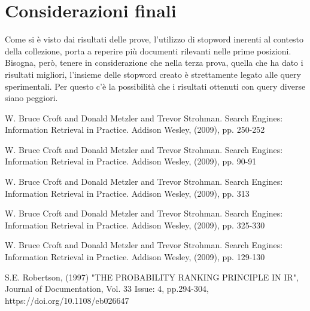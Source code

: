 \documentclass[runningheads]{llncs}
\begin{document}
\section{Considerazioni finali}
\vspace{-5mm}
Come si \`e visto dai risultati delle prove, l'utilizzo di stopword inerenti al contesto
della collezione, porta a reperire pi\`u documenti rilevanti nelle prime posizioni.
Bisogna, per\`o, tenere in considerazione che nella terza prova, quella che ha dato
i risultati migliori, l'insieme delle stopword creato \`e strettamente legato alle
query sperimentali. Per questo c'\`e la possibilit\`a che i risultati ottenuti con query diverse
siano peggiori.

\vskip 1.5in

\begin{thebibliography}{8}

W. Bruce Croft and Donald Metzler and Trevor Strohman. Search Engines: Information Retrieval in Practice. Addison Wesley, (2009), pp. 250-252

W. Bruce Croft and Donald Metzler and Trevor Strohman. Search Engines: Information Retrieval in Practice. Addison Wesley, (2009), pp. 90-91

W. Bruce Croft and Donald Metzler and Trevor Strohman. Search Engines: Information Retrieval in Practice. Addison Wesley, (2009), pp. 313

W. Bruce Croft and Donald Metzler and Trevor Strohman. Search Engines: Information Retrieval in Practice. Addison Wesley, (2009), pp. 325-330

W. Bruce Croft and Donald Metzler and Trevor Strohman. Search Engines: Information Retrieval in Practice. Addison Wesley, (2009), pp. 129-130

S.E. Robertson, (1997) "THE PROBABILITY RANKING PRINCIPLE IN IR", Journal of Documentation, Vol. 33 Issue: 4, pp.294-304, https://doi.org/10.1108/eb026647

\end{thebibliography}
\end{document}
